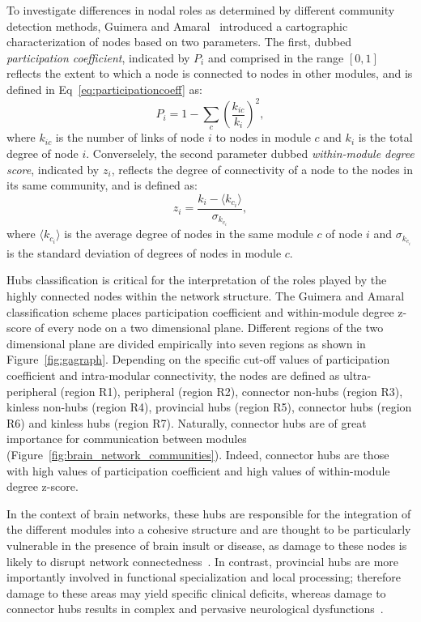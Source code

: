 To investigate differences in nodal roles as determined by different community detection methods, Guimera and Amaral~\cite{guimera2005} introduced a cartographic characterization of nodes based on two parameters.
The first, dubbed \emph{participation coefficient}, indicated by $P_i$ and comprised in the range $[0,1]$ reflects the extent to which a node is connected to nodes in other modules, and is defined in Eq~\ref{eq:participationcoeff} as:
\begin{equation}\label{eq:participationcoeff}
P_i = 1 - \sum_c \left( \frac{k_{ic}}{k_i} \right)^2,
\end{equation}
where $k_{ic}$ is the number of links of node $i$ to nodes in module $c$ and $k_i$ is the total degree of node $i$.
Converselely, the second parameter dubbed \emph{within-module degree score}, indicated by $z_i$,  reflects the degree of connectivity of a node to the nodes in its same community, and is defined as: 
\begin{equation}\label{eq:withinmoduledegree}
z_i = \frac{k_i - \langle  k_{c_i} \rangle }{\sigma_{k_{c_i}}},
\end{equation}
where $\langle  k_{c_i} \rangle $ is the average degree of nodes in the same module $c$ of node $i$ and $\sigma_{k_{c_i}}$ is the standard deviation of degrees of nodes in module $c$.

Hubs classification is critical for the interpretation of the roles played by the highly connected nodes within the network structure.
The Guimera and Amaral~\cite{guimera2005} classification scheme places participation coefficient and within-module degree z-score of every node on a two dimensional plane.
Different regions of the two dimensional plane are divided empirically into seven regions as shown in Figure~\ref{fig:gagraph}.
Depending on the specific cut-off values of participation coefficient and intra-modular connectivity, the nodes are defined as ultra-peripheral (region R1), peripheral (region R2), connector non-hubs (region R3), kinless non-hubs (region R4), provincial hubs (region R5), connector hubs (region R6) and kinless hubs (region R7).
Naturally, connector hubs are of great importance for communication between modules (Figure~\ref{fig:brain_network_communities}).
Indeed, connector hubs are those with high values of participation coefficient and high values of within-module degree z-score.

In the context of brain networks, these hubs are responsible for the integration of the different modules into a cohesive structure and are thought to be particularly vulnerable in the presence of brain insult or disease, as damage to these nodes is likely to disrupt network connectedness~\cite{stam2014,fornito2015,alexander-bloch2010}.
In contrast, provincial hubs are more importantly involved in functional specialization and local processing; therefore damage to these areas may yield specific clinical deficits, whereas damage to connector hubs results in complex and pervasive neurological dysfunctions~\cite{stam2014,fornito2015}.

